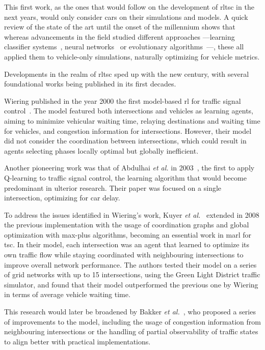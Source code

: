 This first work, as the ones that would follow on the development of \gls{rltsc} in the next years, would only consider cars on their simulations and models. A quick review of the state of the art until the onset of the millennium shows that whereas advancements in the field studied different approaches —learning classifier systems~\cite{Cao1999}, neural networks~\cite{Ledoux1997} or evolutionary algorithms~\cite{Kim1998}—, these all applied them to vehicle-only simulations, naturally optimizing for vehicle metrics.

\medskip

\noindent Developments in the realm of \gls{rltsc} sped up with the new century, with several foundational works being published in its first decades.

Wiering published in the year 2000 the first model-based \gls{rl} for traffic signal control~\cite{Wiering2000}. The model featured both intersections and vehicles as learning agents, aiming to minimize vehicular waiting time, relaying destinations and waiting time for vehicles, and congestion information for intersections. However, their model did not consider the coordination between intersections, which could result in agents selecting phases locally optimal but globally inefficient.

Another pioneering work was that of Abdulhai \textit{et al.} in 2003~\cite{Abdulhai2003}, the first to apply Q-learning to traffic signal control, the learning algorithm that would become predominant in ulterior research. Their paper was focused on a single intersection, optimizing for car delay.

To address the issues identified in Wiering's work, Kuyer \textit{et al.}~\cite{Kuyer2008} extended in 2008 the previous implementation with the usage of coordination graphs and global optimization with max-plus algorithms, becoming an essential work in \acrfull{marl} for \gls{tsc}. In their model, each intersection was an agent that learned to optimize its own traffic flow while staying coordinated with neighbouring intersections to improve overall network performance. The authors tested their model on a series of grid networks with up to 15 intersections, using the Green Light District traffic simulator, and found that their model outperformed the previous one by Wiering in terms of average vehicle waiting time.

This research would later be broadened by Bakker \textit{et al.}~\cite{Bakker2010}, who proposed a series of improvements to the model, including the usage of congestion information from neighbouring intersections or the handling of partial observability of traffic states to align better with practical implementations.

